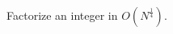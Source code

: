 Factorize an integer in $O(N^{\frac{1}{4}})$.

\inputminted{cpp}{src/mathematics/primality/squfof.cpp.com}
